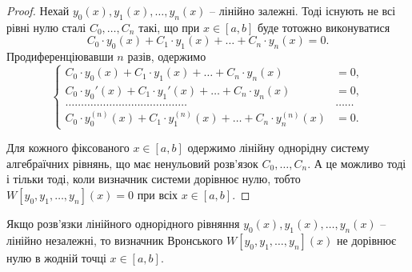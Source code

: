 \begin{proof}
	Нехай $y_0(x), y_1(x), \ldots, y_n(x)$ -- лінійно залежні. Тоді існують не всі рівні нулю сталі $C_0, \ldots, C_n$ такі, що при $x \in [a,b]$ буде тотожно виконуватися
	\begin{equation*}
		C_0 \cdot y_0(x) + C_1 \cdot y_1(x) + \ldots + C_n \cdot y_n(x) = 0.
	\end{equation*}
	Продиференціювавши $n$ разів, одержимо 
	\begin{equation*}
		\left\{ \begin{aligned}
			C_0 \cdot y_0(x) + C_1 \cdot y_1(x) + \ldots + C_n \cdot y_n(x) &= 0, \\
			C_0 \cdot y_0'(x) + C_1 \cdot y_1'(x) + \ldots + C_n \cdot y_n(x) &= 0, \\
			\ldots \ldots \ldots \ldots \ldots \ldots \ldots \ldots \ldots \ldots \ldots \ldots \ldots & \ldots \ldots \\
			C_0 \cdot y_0^{(n)}(x) + C_1 \cdot y_1^{(n)}(x) + \ldots + C_n \cdot y_n^{(n)}(x) &= 0.
		\end{aligned} \right.
	\end{equation*}
 
	Для кожного фіксованого $x \in [a,b]$ одержимо лінійну однорідну систему алгебраїчних рівнянь, що має ненульовий розв’язок $C_0, \ldots, C_n$. А це можливо тоді і тільки тоді, коли визначник системи дорівнює нулю, тобто $W[y_0, y_1, \ldots, y_n](x) = 0$ при всіх $x \in [a,b]$.
\end{proof}

\begin{theorem}
	Якщо розв’язки лінійного однорідного рівняння $y_0(x), y_1(x), \ldots, y_n(x)$ -- лінійно незалежні, то визначник Вронського $W[y_0, y_1, \ldots, y_n](x)$ не дорівнює нулю в жодній точці $x \in [a,b]$.
\end{theorem} 

